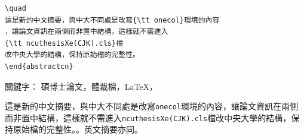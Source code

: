 \begin{appendB}
\begin{Verbatim}[frame=single,firstline=1,lastline=50,rulecolor=\color{red},label=New abstract]
\quad
這是新的中文摘要，與中大不同處是改寫{\tt onecol}環境的內容
，讓論文資訊在兩側而非置中結構，這樣就不需進入
{\tt ncuthesisXe(CJK).cls}檔
改中央大學的結構，保持原始檔的完整性。
\end{abstractcn}
\end{Verbatim}      




\makeatletter
\renewenvironment{onecol}[1]
{\cleardoublepage\phantomsection
\addcontentsline{toc}{subsection}{#1} %
\begin{alwayssingle}
\thispagestyle{plain}
\begin{center}
{\Huge \bfseries #1}
\end{center}
\setlength{\parindent}{0pt}
{\Large 論文名稱：\@title \hfill頁數：101 頁
\par \vspace*{1ex}}
{\Large 校所系別：\@dept \par \vspace*{1ex}}
{\Large 畢業日期：\@degreedate \hfill 學位：\@degree \par \vspace*{1ex}}
{\Large 研究生：\@author \hfill指導教授：\@mprof \par \vspace*{2ex}}
}
{\null \vfill
\end{alwayssingle}}
\makeatother

\begin{abstractcn}
關鍵字： 碩博士論文，體裁檔，\LaTeX，\XeLaTeX
\vspace{2ex}

\quad

這是新的中文摘要，與中大不同處是改寫{\tt onecol}環境的內容，讓論文資訊在兩側而非置中結構，這樣就不需進入{\tt ncuthesisXe(CJK).cls}檔改中央大學的結構，保持原始檔的完整性。。英文摘要亦同。


\end{abstractcn}
\end{appendB}
